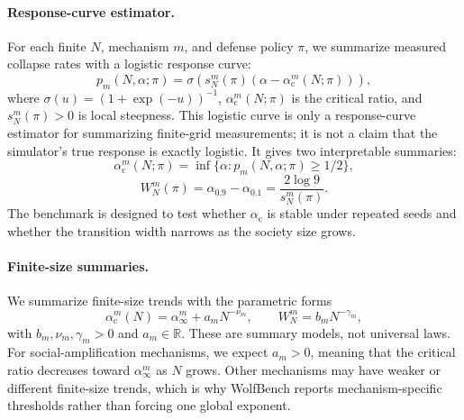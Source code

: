 \documentclass[letterpaper]{article} %
\newcommand{\alphac}{\alpha_{\mathrm{c}}}
\begin{document}
\paragraph{Response-curve estimator.}
For each finite \(N\), mechanism \(m\), and defense policy \(\pi\), we summarize
measured collapse rates with a logistic response curve:
\[
    p_m(N,\alpha;\pi)
    =
    \sigma\left(
    s_N^m(\pi)\left(\alpha-\alphac^m(N;\pi)\right)
    \right),
\]
where \(\sigma(u)=(1+\exp(-u))^{-1}\), \(\alphac^m(N;\pi)\) is the critical
ratio, and \(s_N^m(\pi)>0\) is local steepness. This logistic curve is only a
response-curve estimator for summarizing finite-grid measurements; it is not a
claim that the simulator's true response is exactly logistic. It gives two
interpretable summaries:
\[
    \alphac^m(N;\pi)=\inf\{\alpha:p_m(N,\alpha;\pi)\geq 1/2\},
\]
\[
    W_N^m(\pi)=\alpha_{0.9}-\alpha_{0.1}
    =\frac{2\log 9}{s_N^m(\pi)}.
\]
The benchmark is designed to test whether \(\alphac\) is stable under repeated
seeds and whether the transition width narrows as the society size grows.

\paragraph{Finite-size summaries.}
We summarize finite-size trends with the parametric forms
\[
    \alphac^m(N) = \alpha_\infty^m + a_m N^{-\nu_m},
    \qquad
    W_N^m = b_m N^{-\gamma_m},
\]
with \(b_m,\nu_m,\gamma_m>0\) and \(a_m\in\mathbb{R}\). These are summary
models, not universal laws. For social-amplification mechanisms, we expect
\(a_m>0\), meaning that the critical ratio decreases toward
\(\alpha_\infty^m\) as \(N\) grows. Other mechanisms may have weaker or
different finite-size trends, which is why WolfBench reports mechanism-specific
thresholds rather than forcing one global exponent.
\end{document}
